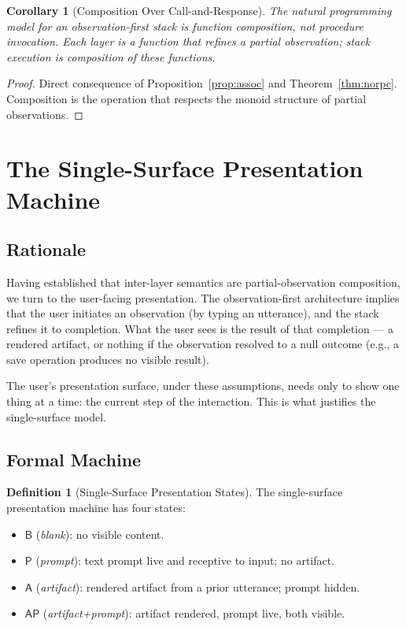 \documentclass[11pt,twocolumn,a4paper]{article}
\newtheorem{corollary}[theorem]{Corollary}
\theoremstyle{definition}
\newtheorem{definition}[theorem]{Definition}
\theoremstyle{remark}
\begin{document}
\begin{corollary}[Composition Over Call-and-Response]
\label{cor:composition}
The natural programming model for an observation-first stack is function composition, not procedure invocation. Each layer is a function that refines a partial observation; stack execution is composition of these functions.
\end{corollary}

\begin{proof}
Direct consequence of Proposition~\ref{prop:assoc} and Theorem~\ref{thm:norpc}. Composition is the operation that respects the monoid structure of partial observations.
\end{proof}

\section{The Single-Surface Presentation Machine}
\label{sec:single-surface}

\subsection{Rationale}

Having established that inter-layer semantics are partial-observation composition, we turn to the user-facing presentation. The observation-first architecture implies that the user initiates an observation (by typing an utterance), and the stack refines it to completion. What the user sees is the result of that completion --- a rendered artifact, or nothing if the observation resolved to a null outcome (e.g., a save operation produces no visible result).

The user's presentation surface, under these assumptions, needs only to show one thing at a time: the current step of the interaction. This is what justifies the single-surface model.

\subsection{Formal Machine}

\begin{definition}[Single-Surface Presentation States]
\label{def:ssp}
The single-surface presentation machine has four states:
\begin{itemize}
    \item $\mathsf{B}$ (\emph{blank}): no visible content.
    \item $\mathsf{P}$ (\emph{prompt}): text prompt live and receptive to input; no artifact.
    \item $\mathsf{A}$ (\emph{artifact}): rendered artifact from a prior utterance; prompt hidden.
    \item $\mathsf{AP}$ (\emph{artifact+prompt}): artifact rendered, prompt live, both visible.
\end{itemize}
\end{definition}
\end{document}
